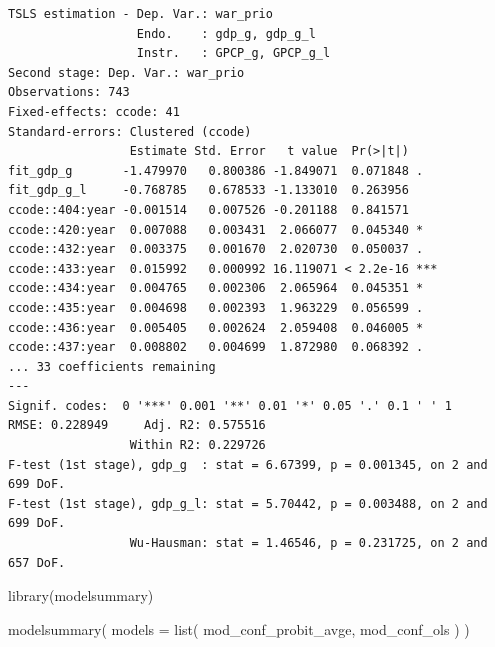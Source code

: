 \documentclass[
  a4paper,
  DIV=11,
  oneside]{scrreprt}
\newenvironment{Shaded}{\begin{snugshade}}{\end{snugshade}}
\newcommand{\AttributeTok}[1]{\textcolor[rgb]{0.40,0.45,0.13}{#1}}
\newcommand{\FunctionTok}[1]{\textcolor[rgb]{0.28,0.35,0.67}{#1}}
\newcommand{\NormalTok}[1]{\textcolor[rgb]{0.00,0.23,0.31}{#1}}
\begin{document}
\begin{verbatim}
TSLS estimation - Dep. Var.: war_prio
                  Endo.    : gdp_g, gdp_g_l
                  Instr.   : GPCP_g, GPCP_g_l
Second stage: Dep. Var.: war_prio
Observations: 743
Fixed-effects: ccode: 41
Standard-errors: Clustered (ccode) 
                 Estimate Std. Error   t value  Pr(>|t|)    
fit_gdp_g       -1.479970   0.800386 -1.849071  0.071848 .  
fit_gdp_g_l     -0.768785   0.678533 -1.133010  0.263956    
ccode::404:year -0.001514   0.007526 -0.201188  0.841571    
ccode::420:year  0.007088   0.003431  2.066077  0.045340 *  
ccode::432:year  0.003375   0.001670  2.020730  0.050037 .  
ccode::433:year  0.015992   0.000992 16.119071 < 2.2e-16 ***
ccode::434:year  0.004765   0.002306  2.065964  0.045351 *  
ccode::435:year  0.004698   0.002393  1.963229  0.056599 .  
ccode::436:year  0.005405   0.002624  2.059408  0.046005 *  
ccode::437:year  0.008802   0.004699  1.872980  0.068392 .  
... 33 coefficients remaining
---
Signif. codes:  0 '***' 0.001 '**' 0.01 '*' 0.05 '.' 0.1 ' ' 1
RMSE: 0.228949     Adj. R2: 0.575516
                 Within R2: 0.229726
F-test (1st stage), gdp_g  : stat = 6.67399, p = 0.001345, on 2 and 699 DoF.
F-test (1st stage), gdp_g_l: stat = 5.70442, p = 0.003488, on 2 and 699 DoF.
                 Wu-Hausman: stat = 1.46546, p = 0.231725, on 2 and 657 DoF.
\end{verbatim}

\begin{Shaded}
\begin{Highlighting}[]
\FunctionTok{library}\NormalTok{(modelsummary)}

\FunctionTok{modelsummary}\NormalTok{(}
  \AttributeTok{models =} \FunctionTok{list}\NormalTok{(}
\NormalTok{    mod\_conf\_probit\_avge, }
\NormalTok{    mod\_conf\_ols}
\NormalTok{    )}
\NormalTok{  )}
\end{Highlighting}
\end{Shaded}
\end{document}
